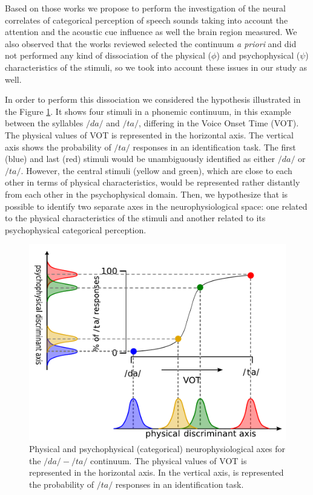 Based on those works we propose to perform the investigation of the neural
correlates of categorical perception of speech sounds taking into account the
attention and the acoustic cue influence as well the brain region measured. We
also observed that the works reviewed selected the continuum \textit{a priori}
and did not performed any kind of dissociation of the physical ($\phi$) and
psychophysical ($\psi$) characteristics of the stimuli, so we took into account
these issues in our study as well.

In order to perform this dissociation we considered the hypothesis illustrated
in the Figure \ref{cat}. It shows four stimuli in a phonemic continuum, in this
example between the syllables $/da/$ and $/ta/$, differing in the Voice Onset
Time (VOT). The physical values of VOT is represented in the horizontal axis.
The vertical axis shows the probability of $/ta/$ responses in an
identification task. The first (blue) and last (red) stimuli would be
unambiguously identified as either $/da/$ or $/ta/$. However, the central
stimuli (yellow and green), which are close to each other in terms of physical
characteristics, would be represented rather distantly from each other in the
psychophysical domain. Then, we hypothesize that is possible to identify two
separate axes in the neurophysiological space: one related to the physical
characteristics of the stimuli and another related to its psychophysical
categorical perception. 

\begin{figure}
\centering
\includegraphics[width=\linewidth]{imgs/categ.pdf}
\caption{Physical and psychophysical (categorical) neurophysiological axes for
the $/da/-/ta/$ continuum. The physical values of VOT is represented in the
horizontal axis. In the vertical axis, is represented the probability of $/ta/$
responses in an identification task.} \label{cat}
\end{figure} 



